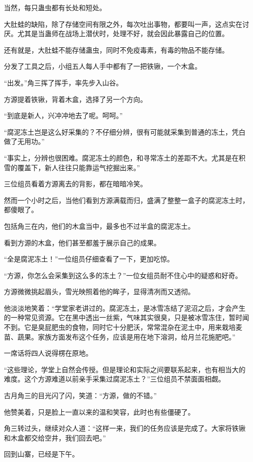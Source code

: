 \begin{this_body}
当然，每只蛊虫都有长处和短处。

大肚蛙的缺陷，除了存储空间有限之外，每次吐出事物，都要叫一声，这点实在讨厌。尤其是当蛊师在战场上潜伏时，处理不好，就会因此暴露自己的位置。

还有就是，大肚蛙不能存储蛊虫，同时不免疫毒素，有毒的物品不能存储。

分发了工具之后，小组五人每人手中都有了一把铁锹，一个木盒。

“出发。”角三挥了挥手，率先步入山谷。

方源提着铁锹，背着木盒，选择了另一个方向。

“到底是新人，兴冲冲地去了呢。呵呵。”

“腐泥冻土岂是这么好采集的？不仔细分辨，很有可能就采集到普通的冻土，凭白做了无用功。”

“事实上，分辨也很困难。腐泥冻土的颜色，和寻常冻土的差距不大。尤其是在积雪的覆盖下，新人往往只能靠运气挖掘出来。”

三位组员看着方源离去的背影，都在暗暗冷笑。

然而一个小时之后，当他们看到方源满载而归，盛满了整整一盒子的腐泥冻土时，都傻眼了。

包括角三在内，他们的木盒当中，最多也不过半盒的腐泥冻土。

看到方源的木盒，他们甚至都羞于展示自己的成果。

“全是腐泥冻土！”一位组员仔细查看了一下，更加吃惊。

“方源，你怎么会采集到这么多的冻土？”一位女组员耐不住心中的疑惑和好奇。

方源微微挑起眉头，雪光映照着他的眸子，显得清冽而又透彻。

他淡淡地笑着：“学堂家老讲过的。腐泥冻土，是冰雪冻结了泥沼之后，才会产生的一种常见资源。它在黑中透出一丝紫，气味其实很臭，只是被冰雪冻住，暂时闻不到。它是臭屁肥虫的食物，同时它十分肥沃，常常混杂在泥土中，用来栽培麦苗、蔬果。家族方面发布这个任务，应该是用在地下溶洞，给月兰花施肥吧。”

一席话将四人说得楞在原地。

“这些理论，学堂上自然会传授。但是理论和实际之间要联系起来，也有相当大的难度。这个方源难道以前亲手采集过腐泥冻土？”三位组员不禁面面相觑。

古月角三的目光闪了闪，笑道：“方源，做的不错。”

他赞美着，只是脸上一直以来的温和笑容，此时也有些僵硬了。

角三转过头，继续对众人道：“这样一来，我们的任务应该是完成了。大家将铁锹和木盒都交给空井，我们回去吧。”

回到山寨，已经是下午。


\end{this_body}
